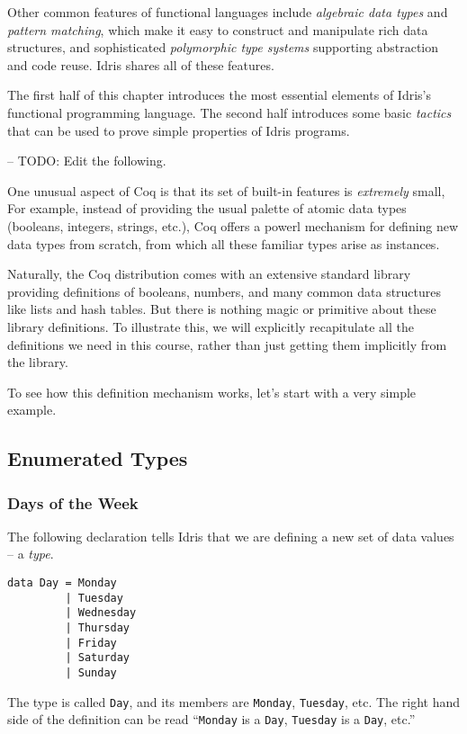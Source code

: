 \documentclass[b5paper,twoside]{amsbook}
\begin{document}
Other common features of functional languages include \emph{algebraic
data types} and \emph{pattern matching}, which make it easy to construct
and manipulate rich data structures, and sophisticated \emph{polymorphic
type systems} supporting abstraction and code reuse. Idris shares all of
these features.

The first half of this chapter introduces the most essential elements of
Idris's functional programming language. The second half introduces some
basic \emph{tactics} that can be used to prove simple properties of
Idris programs.

-- TODO: Edit the following.

One unusual aspect of Coq is that its set of built-in features is
\emph{extremely} small, For example, instead of providing the usual
palette of atomic data types (booleans, integers, strings, etc.), Coq
offers a powerl mechanism for defining new data types from scratch, from
which all these familiar types arise as instances.

Naturally, the Coq distribution comes with an extensive standard library
providing definitions of booleans, numbers, and many common data
structures like lists and hash tables. But there is nothing magic or
primitive about these library definitions. To illustrate this, we will
explicitly recapitulate all the definitions we need in this course,
rather than just getting them implicitly from the library.

To see how this definition mechanism works, let's start with a very
simple example.

\subsection{Enumerated Types}\label{enumerated-types}

\subsubsection{Days of the Week}\label{days-of-the-week}

The following declaration tells Idris that we are defining a new set of
data values -- a \emph{type}.

\begin{verbatim}
data Day = Monday
         | Tuesday
         | Wednesday
         | Thursday
         | Friday
         | Saturday
         | Sunday
\end{verbatim}

The type is called \texttt{Day}, and its members are
\texttt{Monday}, \texttt{Tuesday}, etc. The
right hand side of the definition can be read
``\texttt{Monday} is a \texttt{Day},
\texttt{Tuesday} is a \texttt{Day}, etc.''
\end{document}
